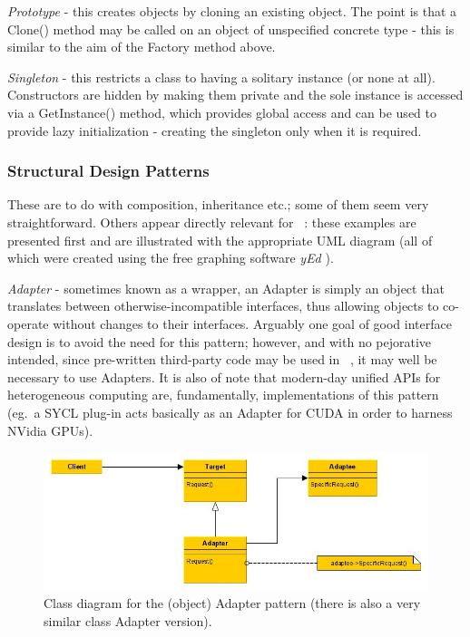 {\it Prototype} - this creates objects by cloning an existing object.
The point is that a Clone() method may be called on an object of unspecified concrete type - this is similar to the aim of the Factory method above.

{\it Singleton} - this restricts a class to having a solitary instance (or none at all).
Constructors are hidden by making them private and the sole instance is accessed via a GetInstance() method, which provides global access and can be used to provide lazy initialization - creating the singleton only when it is required.

\subsubsection*{Structural Design Patterns}

These are to do with composition, inheritance etc.; some of them seem very straightforward.
Others appear directly relevant for \nep \ : these examples are presented first and are illustrated with the appropriate UML diagram (all of which were created using the free graphing software {\it yEd} \cite{yedwebsite}).

{\it Adapter} - sometimes known as a wrapper, an Adapter is simply an object that translates between otherwise-incompatible interfaces, thus allowing objects to co-operate without changes to their interfaces.
Arguably one goal of good interface design is to avoid the need for this pattern; however, and with no pejorative intended, since pre-written third-party code may be used in \nep \ , it may well be necessary to use Adapters.  It is also of note that modern-day unified APIs for heterogeneous computing are, fundamentally, implementations of this pattern (eg.\ a SYCL plug-in acts basically as an Adapter for CUDA in order to harness NVidia GPUs). 

\begin{figure}
\begin{centering}
\includegraphics[width=12cm]{../png/adapter.jpg}
\end{centering}
\caption{Class diagram for the (object) Adapter pattern (there is also a very similar class Adapter version).\label{fig:adapter}}
\end{figure}


